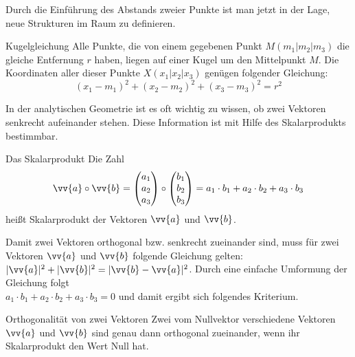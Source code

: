 Durch die Einführung des Abstands zweier Punkte ist man jetzt in der Lage, neue Strukturen im Raum zu definieren. 
\begin{b8d}{Kugelgleichung}{}
Alle Punkte, die von einem gegebenen Punkt $M(m_1|m_2|m_3)$ die gleiche Entfernung $r$ haben, liegen auf einer Kugel um den Mittelpunkt $M$. Die Koordinaten aller dieser Punkte $X(x_1|x_2|x_3)$ genügen folgender Gleichung: $$(x_1-m_1)^2 + (x_2 -m_2)^2 + (x_3 -m_3)^2 = r^2$$
\end{b8d}
In der analytischen Geometrie ist es oft wichtig zu wissen, ob zwei Vektoren senkrecht aufeinander stehen. Diese Information ist mit Hilfe des Skalarprodukts bestimmbar.

\begin{merke}{Das Skalarprodukt}{}
Die Zahl $$\vv{a} \circ \vv{b} = \begin{pmatrix} a_1 \\a_2 \\a_3\end{pmatrix} \circ \begin{pmatrix} b_1 \\b_2 \\b_3\end{pmatrix} = a_1\cdot b_1 + a_2\cdot b_2 + a_3\cdot b_3$$ heißt Skalarprodukt der Vektoren $\vv{a}$ und $\vv{b}$. 
\end{merke}
Damit zwei Vektoren orthogonal bzw. senkrecht zueinander sind, muss für zwei Vektoren $\vv{a}$ und $\vv{b}$ folgende Gleichung gelten: $|\vv{a}|^2 + |\vv{b}|^2 = |\vv{b} -\vv{a}|^2$. Durch eine einfache Umformung der Gleichung folgt\\ $ a_1\cdot b_1 + a_2\cdot b_2 + a_3\cdot b_3 = 0$ und damit ergibt sich folgendes Kriterium.
\begin{b8d}{Orthogonalität von zwei Vektoren}{} 
Zwei vom Nullvektor verschiedene Vektoren $\vv{a}$ und $\vv{b}$ sind genau dann orthogonal zueinander, wenn ihr Skalarprodukt den Wert Null hat.
\end{b8d}
